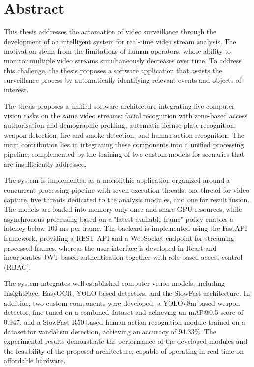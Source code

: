 \newpage

\chapter*{Abstract}

\thispagestyle{front}

This thesis addresses the automation of video surveillance through the development of an intelligent system for real-time video stream analysis. The motivation stems from the limitations of human operators, whose ability to monitor multiple video streams simultaneously decreases over time. To address this challenge, the thesis proposes a software application that assists the surveillance process by automatically identifying relevant events and objects of interest.

The thesis proposes a unified software architecture integrating five computer vision tasks on the same video streams: facial recognition with zone-based access authorization and demographic profiling, automatic license plate recognition, weapon detection, fire and smoke detection, and human action recognition. The main contribution lies in integrating these components into a unified processing pipeline, complemented by the training of two custom models for scenarios that are insufficiently addressed.

The system is implemented as a monolithic application organized around a concurrent processing pipeline with seven execution threads: one thread for video capture, five threads dedicated to the analysis modules, and one for result fusion. The models are loaded into memory only once and share GPU resources, while asynchronous processing based on a "latest available frame" policy enables a latency below 100 ms per frame. The backend is implemented using the FastAPI framework, providing a REST API and a WebSocket endpoint for streaming processed frames, whereas the user interface is developed in React and incorporates JWT-based authentication together with role-based access control (RBAC).

The system integrates well-established computer vision models, including InsightFace, EasyOCR, YOLO-based detectors, and the SlowFast architecture. In addition, two custom components were developed: a YOLOv8m-based weapon detector, fine-tuned on a combined dataset and achieving an mAP@0.5 score of 0.947, and a SlowFast-R50-based human action recognition module trained on a dataset for vandalism detection, achieving an accuracy of 94.33\%. The experimental results demonstrate the performance of the developed modules and the feasibility of the proposed architecture, capable of operating in real time on affordable hardware.


